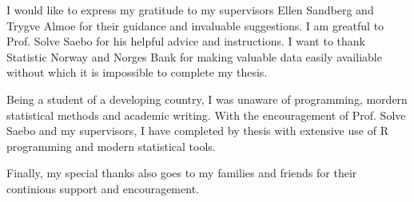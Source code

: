 I would like to express my gratitude to my supervisors Ellen Sandberg and Trygve Almoe for their guidance and invaluable suggestions. I am greatful to Prof. Solve Saebo for his helpful advice and instructions. I want to thank Statistic Norway and Norges Bank for making valuable data easily availiable without which it is impossible to complete my thesis.

Being a student of a developing country, I was unaware of programming, mordern statistical methods and academic writing. With the encouragement of Prof. Solve Saebo and my supervisors, I have completed by thesis with extensive use of R programming and modern statistical tools.

Finally, my special thanks also goes to my families and friends for their continious support and encouragement.